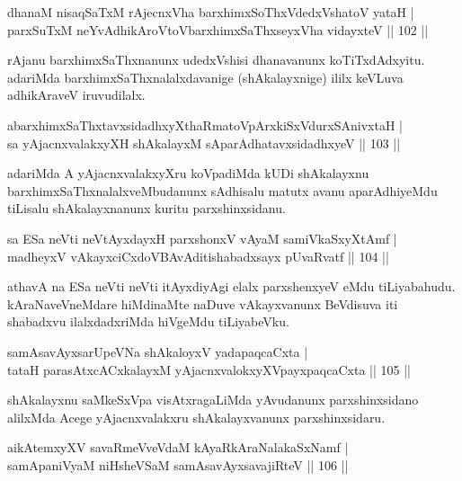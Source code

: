 \begin{shl}
dhanaM nisaqSaTxM rAjecnxVha barxhimxSoThxVdedxVshatoV yataH |\\
parxSuTxM neYvAdhikAroV\s toV\s barxhimxSaThxseyxVha vidayxteV \hfill || 102 ||
\end{shl}

\begin{artha}
rAjanu barxhimxSaThxnanunx udedxVshisi dhanavanunx koTiTxdAdxyitu. adariMda barxhimxSaThxnalalxdavanige (shAkalayxnige) ililx keVLuva adhikAraveV iruvudilalx.
\end{artha}

\begin{shl}
abarxhimxSaThxtavxsidadhxyXthaRmatoV\s pArxkiSxVdurxSA\s nivxtaH |\\
sa yAjacnxvalakxyXH shAkalayxM sAparAdhatavxsidadhxyeV \hfill || 103 ||
\end{shl}

\begin{artha}
adariMda A yAjacnxvalakxyXru koVpadiMda kUDi shAkalayxnu barxhimxSaThxnalalxveMbudanunx sAdhisalu matutx avanu aparAdhiyeMdu tiLisalu shAkalayxnanunx kuritu parxshinxsidanu.
\end{artha}

\begin{shl}
sa ESa neVti neVtAyxdayxH parxshonxV vA\s yaM samiVkaSxyXtAmf |\\
madheyxV vAkayxciCxdoV\s BAvAditishabadxsayx pUvaRvatf \hfill || 104 ||
\end{shl}

\begin{artha}%
athavA na ESa neVti neVti itAyxdiyAgi elalx parxshenxyeV eMdu tiLiyabahudu. kAraNaveVneMdare hiMdinaMte naDuve vAkayxvanunx BeVdisuva iti shabadxvu ilalxdadxriMda hiVgeMdu tiLiyabeVku.
\end{artha}

\begin{shl}
samAsavAyxsarUpeVNa shAkaloyxV yadapaqcaCxta |\\
tataH parasAtxcACxkalayxM yAjacnxvalokxyXV\s payxpaqcaCxta \hfill || 105 ||
\end{shl}

\begin{artha}
shAkalayxnu saMkeSxVpa visAtxragaLiMda yAvudanunx parxshinxsidano alilxMda Acege yAjacnxvalakxru shAkalayxvanunx parxshinxsidaru.
\end{artha}


\begin{shl}
aikAtemxyXV savaRmeVveVdaM kAyaRkAraNalakaSxNamf |\\
samApaniVyaM niHsheVSaM samAsavAyxsavajiRteV \hfill || 106 ||
\end{shl}

